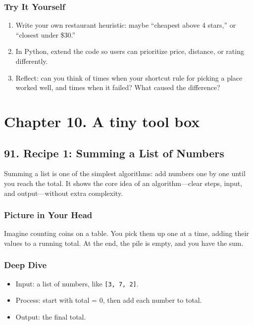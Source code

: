 \documentclass[
  letterpaper,
  DIV=11,
  numbers=noendperiod]{scrreprt}
\providecommand{\tightlist}{%
  \setlength{\itemsep}{0pt}\setlength{\parskip}{0pt}}
\begin{document}
\subsubsection{Try It Yourself}\label{try-it-yourself-90}

\begin{enumerate}
\def\labelenumi{\arabic{enumi}.}
\tightlist
\item
  Write your own restaurant heuristic: maybe ``cheapest above 4 stars,''
  or ``closest under \$30.''
\item
  In Python, extend the code so users can prioritize price, distance, or
  rating differently.
\item
  Reflect: can you think of times when your shortcut rule for picking a
  place worked well, and times when it failed? What caused the
  difference?
\end{enumerate}

\section{Chapter 10. A tiny tool box}\label{chapter-10.-a-tiny-tool-box}

\subsection{91. Recipe 1: Summing a List of
Numbers}\label{recipe-1-summing-a-list-of-numbers}

Summing a list is one of the simplest algorithms: add numbers one by one
until you reach the total. It shows the core idea of an
algorithm---clear steps, input, and output---without extra complexity.

\subsubsection{Picture in Your Head}\label{picture-in-your-head-91}

Imagine counting coins on a table. You pick them up one at a time,
adding their values to a running total. At the end, the pile is empty,
and you have the sum.

\subsubsection{Deep Dive}\label{deep-dive-61}

\begin{itemize}
\tightlist
\item
  Input: a list of numbers, like \texttt{{[}3,\ 7,\ 2{]}}.
\item
  Process: start with total = 0, then add each number to total.
\item
  Output: the final total.
\end{itemize}
\end{document}
